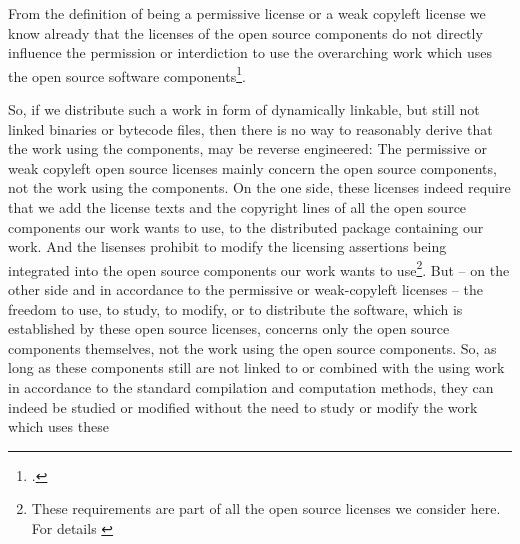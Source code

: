 From the definition of being a permissive license or a weak copyleft license we
know already that the licenses of the open source components do not directly
influence the permission or interdiction to use the overarching work which uses
the open source software components\footcite[cf.][20ff.]{Reincke2015a}.

So, if we distribute such a work in form of dynamically linkable, but still not
linked binaries or bytecode files, then there is no way to reasonably derive
that the work using the components, may be reverse engineered: The permissive or
weak copyleft open source licenses mainly concern the open source components,
not the work using the components. On the one side, these licenses indeed
require that we add the license texts and the copyright lines of all the open
source components our work wants to use, to the distributed package containing
our work. And the lisenses prohibit to modify the licensing assertions being
integrated into the open source components our work wants to use\footnote{These
requirements are part of all the open source licenses we consider here. For
details \cite[cf.][chapter 6.]{Reincke2015a}}. But -- on the other side and in
accordance to the permissive or weak-copyleft licenses -- the freedom to use, to
study, to modify, or to distribute the software, which is established by these
open source licenses, concerns only the open source components themselves, not
the work using the open source components. So, as long as these components still
are not linked to or combined with the using work in accordance to the standard
compilation and computation methods, they can indeed be studied or modified
without the need to study or modify the work which uses these
